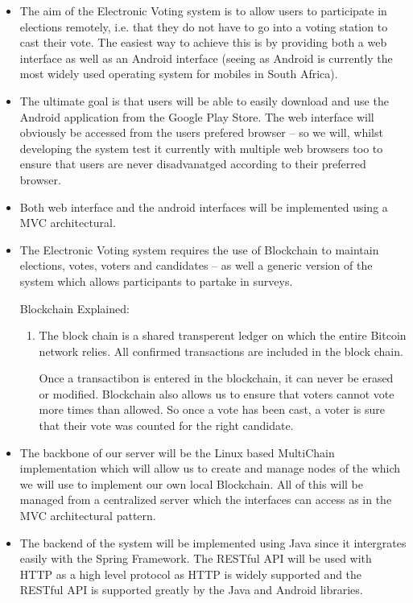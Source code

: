 \begin{itemize}
		\item The aim of the Electronic Voting system is to allow users to participate in elections remotely, i.e. that they do not have to go into a voting station to cast their vote. The easiest way to achieve this is by providing both a web interface as well as an Android interface (seeing as Android is currently the most widely used operating system for mobiles in South Africa). 
		
		\item The ultimate goal is that users will be able to easily download and use the Android application from the Google Play Store. The web interface will obviously be accessed from the users prefered browser – so we will, whilst developing the system test it currently with multiple web browsers too to ensure that users are never disadvanatged according to their preferred browser. 
		
		\item Both web interface and the android interfaces will be implemented using a MVC architectural. 
		
		\item The Electronic Voting system requires the use of Blockchain to maintain elections, votes, voters and candidates – as well a generic version of the system which allows participants to partake in surveys. 
		
		Blockchain Explained: 
		\begin{enumerate}
			\item[] The block chain is a shared transperent ledger on which the entire Bitcoin network relies. All confirmed transactions are included in the block chain. 
			
			Once a transactibon is entered in the blockchain, it can never be erased or modified. Blockchain also allows us to ensure that voters cannot vote more times than allowed. So once a vote has been cast, a voter is sure that their vote was counted for the right candidate. 
		\end{enumerate}
		
		\item The backbone of our server will be the Linux based MultiChain implementation which will allow us to create and manage nodes of the which we will use to implement our own local Blockchain. All of this will be managed from a centralized server which the interfaces can access as in the MVC architectural pattern. 
		
		\item The backend of the system will be implemented using Java since it intergrates easily with the Spring Framework. The RESTful API will be used with HTTP as a high level protocol as HTTP is widely supported and the RESTful API is supported greatly by the Java and Android libraries.  			
		

\end{itemize}

